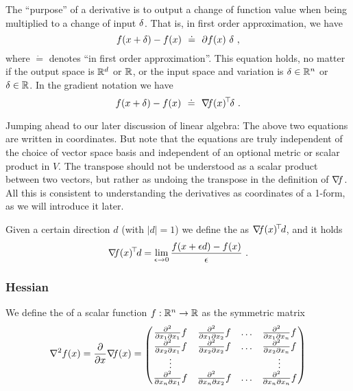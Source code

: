 The ``purpose'' of a derivative is to output a change of function value
when being multiplied to a change of input $\delta$. That is, in first
order approximation, we have
\begin{equation}
f(x+\delta) - f(x) ~~\dot=~~ \partial f(x)~ \delta ~,
\end{equation}
where $\dot=$ denotes ``in first order approximation''. This equation holds, no matter if the output space is ${\mathbb{R}}^d$ or
${\mathbb{R}}$, or the input space and variation is $\delta\in{\mathbb{R}}^n$ or $\delta\in{\mathbb{R}}$. In the gradient notation we have
\begin{equation}
f(x+\delta) - f(x) ~~\dot=~~ {\nabla_{\!\!}} f(x)^{\!\top\!} \delta ~.
\end{equation}

Jumping ahead to our later discussion of linear algebra: The above
two equations are written in coordinates. But note that the equations are
truly independent of the choice of vector space basis and independent
of an optional metric or scalar product in $V$. The transpose should
not be understood as a scalar product between two vectors, but rather
as undoing the transpose in the definition of ${\nabla_{\!\!}} f$. All this is
consistent to understanding the derivatives as coordinates of a
1-form, as we will introduce it later.

Given a certain direction $d$ (with $|d|=1$) we define the  as ${\nabla_{\!\!}} f(x)^{\!\top\!} d$, and it holds
\begin{align}
{\nabla_{\!\!}} f(x)^{\!\top\!} d = \lim_{\epsilon\to 0} \frac{f(x+\epsilon d)-f(x)}{\epsilon} ~.
\end{align}


\subsubsection{Hessian}

\begin{myDefinition}
We define the  of a scalar function $f: {\mathbb{R}}^n \to {\mathbb{R}}$ as the
symmetric matrix
\newcommand{\hessf}[2]{\frac{\del^2}{\del x_#1 \del x_#2} f}
\begin{equation}
\he f(x) = \Del x \na f(x) = 
 \mat{cccc}{
\hessf{1}{1} & \hessf{1}{2} & \dots & \hessf{1}{n} \\
\hessf{2}{1} & \hessf{2}{2} & \dots & \hessf{2}{n} \\
\vdots & & & \vdots \\
\hessf{n}{1} & \hessf{n}{2} & \dots & \hessf{n}{n} } 
\end{equation}
\end{myDefinition}

